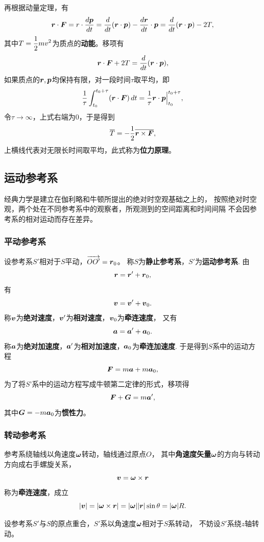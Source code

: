 再根据动量定理，有
$$\r\cdot\F=r\cdot\frac{d\p}{dt}
=\frac{d}{dt}(\r\cdot\p)-\frac{d\r}{dt}\cdot\p
=\frac{d}{dt}(\r\cdot\p)-2T,$$
其中$\dis T=\frac{1}{2}mv^2$为质点的\textbf{动能}。移项有
$$\r\cdot\F+2T=\frac{d}{dt}(\r\cdot\p),$$
如果质点的$\r,\p$均保持有限，对一段时间$\tau$取平均，即
$$\frac{1}{\tau}\int_{t_0}^{t_0+\tau}(\r\cdot\F)\,dt
=\frac{1}{\tau}\r\cdot\p\Big|_{t_0}^{t_0+\tau},$$
令$\tau\to\infty$，上式右端为$0$，于是得到
$$\overline{T}=-\frac{1}{2}\overline{\r\times\F},$$
上横线代表对无限长时间取平均，此式称为\textbf{位力原理}。

\subsection{运动参考系}
经典力学是建立在伽利略和牛顿所提出的绝对时空观基础之上的，
按照绝对时空观，两个处在不同参考系中的观察者，所观测到的空间距离和时间间隔
不会因参考系的相对运动而存在差异。
\subsubsection*{平动参考系}
    设参考系$S'$相对于$S$平动，$\overrightarrow{OO'}=\r_0$。
    称$S$为\textbf{静止参考系}，$S'$为\textbf{运动参考系}.
    由$$\r=\r'+\r_0,$$
    有$$\v=\v'+\v_0.$$
    称$\v$为\textbf{绝对速度}，$\v'$为\textbf{相对速度}，$\v_0$为\textbf{牵连速度}，
    又有$$\a=\a'+\a_0.$$
    称$\a$为\textbf{绝对加速度}，$\a'$为\textbf{相对加速度}，$\a_0$为\textbf{牵连加速度}.
    于是得到$S$系中的运动方程
    $$\F=m\a+m\a_0,$$
    为了将$S’$系中的运动方程写成牛顿第二定律的形式，移项得
    $$\F+\G=m\a',$$
    其中$\G=-m\a_0$为\textbf{惯性力}。

\subsubsection*{转动参考系}
参考系绕轴线以角速度$\o$转动，轴线通过原点$O$，
其中\textbf{角速度矢量}$\o$的方向与转动方向成右手螺旋关系，
$$\v=\o\times\r$$称为\textbf{牵连速度}，成立
$$|\v|=|\o\times\r|=|\o||\r|\sin\theta=|\o|R.$$
设参考系$S'$与$S$的原点重合，$S'$系以角速度$\o$相对于$S$系转动，
不妨设$S'$系绕$z$轴转动。

